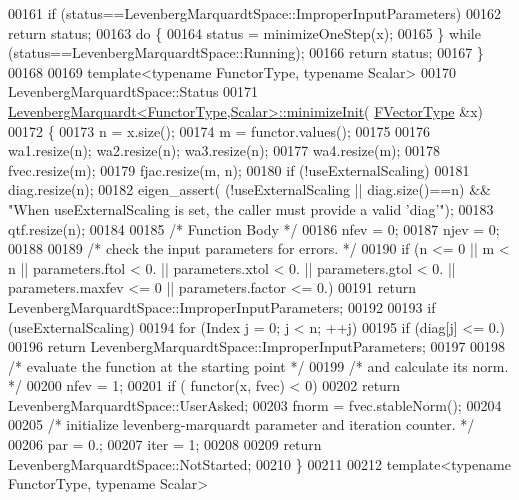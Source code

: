 \begin{DoxyCode}
00161     \textcolor{keywordflow}{if} (status==LevenbergMarquardtSpace::ImproperInputParameters)
00162         \textcolor{keywordflow}{return} status;
00163     \textcolor{keywordflow}{do} \{
00164         status = minimizeOneStep(x);
00165     \} \textcolor{keywordflow}{while} (status==LevenbergMarquardtSpace::Running);
00166     \textcolor{keywordflow}{return} status;
00167 \}
00168 
00169 \textcolor{keyword}{template}<\textcolor{keyword}{typename} FunctorType, \textcolor{keyword}{typename} Scalar>
00170 LevenbergMarquardtSpace::Status
00171 \hyperlink{class_eigen_1_1_levenberg_marquardt}{LevenbergMarquardt<FunctorType,Scalar>::minimizeInit}(
      \hyperlink{group___core___module}{FVectorType}  &x)
00172 \{
00173     n = x.size();
00174     m = functor.values();
00175 
00176     wa1.resize(n); wa2.resize(n); wa3.resize(n);
00177     wa4.resize(m);
00178     fvec.resize(m);
00179     fjac.resize(m, n);
00180     \textcolor{keywordflow}{if} (!useExternalScaling)
00181         diag.resize(n);
00182     eigen\_assert( (!useExternalScaling || diag.size()==n) && \textcolor{stringliteral}{"When useExternalScaling is set, the caller
       must provide a valid 'diag'"});
00183     qtf.resize(n);
00184 
00185     \textcolor{comment}{/* Function Body */}
00186     nfev = 0;
00187     njev = 0;
00188 
00189     \textcolor{comment}{/*     check the input parameters for errors. */}
00190     \textcolor{keywordflow}{if} (n <= 0 || m < n || parameters.ftol < 0. || parameters.xtol < 0. || parameters.gtol < 0. || 
      parameters.maxfev <= 0 || parameters.factor <= 0.)
00191         \textcolor{keywordflow}{return} LevenbergMarquardtSpace::ImproperInputParameters;
00192 
00193     \textcolor{keywordflow}{if} (useExternalScaling)
00194         \textcolor{keywordflow}{for} (Index j = 0; j < n; ++j)
00195             \textcolor{keywordflow}{if} (diag[j] <= 0.)
00196                 \textcolor{keywordflow}{return} LevenbergMarquardtSpace::ImproperInputParameters;
00197 
00198     \textcolor{comment}{/*     evaluate the function at the starting point */}
00199     \textcolor{comment}{/*     and calculate its norm. */}
00200     nfev = 1;
00201     \textcolor{keywordflow}{if} ( functor(x, fvec) < 0)
00202         \textcolor{keywordflow}{return} LevenbergMarquardtSpace::UserAsked;
00203     fnorm = fvec.stableNorm();
00204 
00205     \textcolor{comment}{/*     initialize levenberg-marquardt parameter and iteration counter. */}
00206     par = 0.;
00207     iter = 1;
00208 
00209     \textcolor{keywordflow}{return} LevenbergMarquardtSpace::NotStarted;
00210 \}
00211 
00212 \textcolor{keyword}{template}<\textcolor{keyword}{typename} FunctorType, \textcolor{keyword}{typename} Scalar>

\end{DoxyCode}
